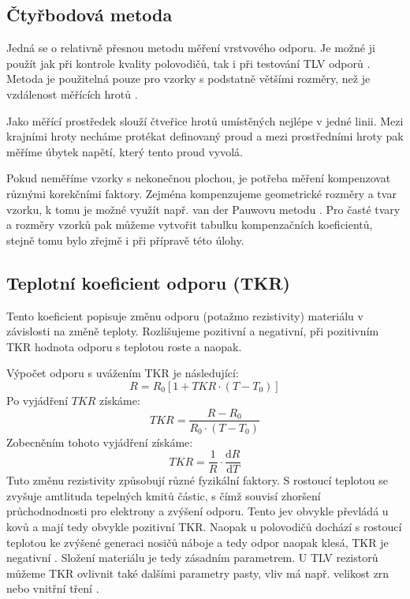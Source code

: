 \subsection{Čtyřbodová metoda}
Jedná se o relativně přesnou metodu měření vrstvového odporu. Je možné ji použít jak při kontrole kvality polovodičů, tak i při testování TLV odporů \cite{zadani}. Metoda je použitelná pouze pro vzorky s podstatně většími rozměry, než je vzdálenost měřících hrotů \cite{hrabovsky2012}. 

Jako měřící prostředek slouží čtveřice hrotů umístěných nejlépe v jedné linii. Mezi krajními hroty necháme protékat definovaný proud a mezi prostředními hroty pak měříme úbytek napětí, který tento proud vyvolá. 

Pokud neměříme vzorky s nekonečnou plochou, je potřeba měření kompenzovat různými korekčními faktory. Zejména kompenzujeme geometrické rozměry a tvar vzorku, k tomu je možné využít např. van der Pauwovu metodu \cite{zadani,hrabovsky2012}. Pro časté tvary a rozměry vzorků pak můžeme vytvořit tabulku kompenzačních koeficientů, stejně tomu bylo zřejmě i při přípravě této úlohy. 

\subsection{Teplotní koeficient odporu (TKR)}
Tento koeficient popisuje změnu odporu (potažmo rezistivity) materiálu v závislosti na změně teploty. Rozlišujeme pozitivní a negativní, při pozitivním TKR hodnota odporu s teplotou roste a naopak. 

Výpočet odporu s uvážením TKR je následující:
\[
    R=R_{0} [1+TKR\cdot(T-T_{0} )]
\]
Po vyjádření \(TKR\) získáme:
\[
    TKR = \frac{R-R_{0} }{R_{0} \cdot (T-T_{0} )}
\]
Zobecněním tohoto vyjádření získáme:
\[
    TKR=\frac{1}{R}\cdot\frac{\mathrm{d}R}{\mathrm{d}T} 
\]
Tuto změnu rezistivity způsobují různé fyzikální faktory. S rostoucí teplotou se zvyšuje amtlituda tepelných kmitů částic, s čímž souvisí zhoršení průchodnodnosti pro elektrony a zvýšení odporu. Tento jev obvykle převládá u kovů a mají tedy obvykle pozitivní TKR. Naopak u polovodičů dochází s rostoucí teplotou ke zvýšené generaci nosičů náboje a tedy odpor naopak klesá, TKR je negativní \cite{zadani}. Složení materiálu je tedy zásadním parametrem. U TLV rezistorů můžeme TKR ovlivnit také dalšími parametry pasty, vliv má např. velikost zrn nebo vnitřní tření \cite{tcrArticle}.



